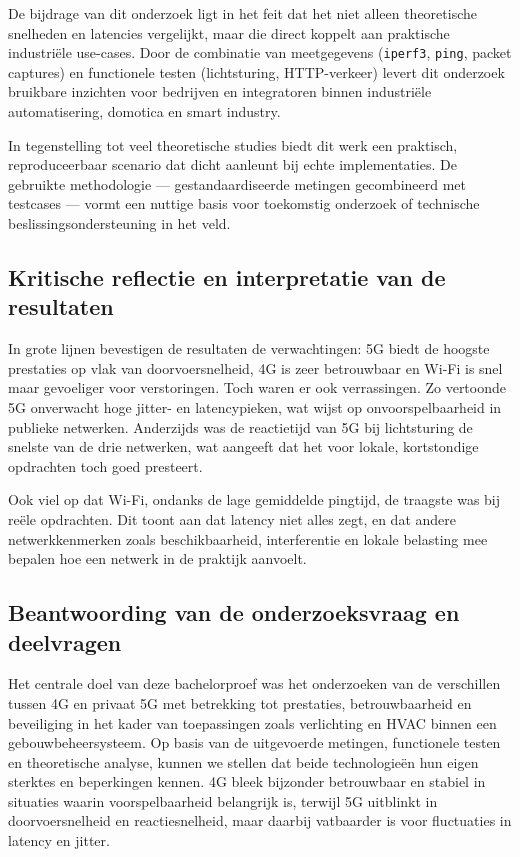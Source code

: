 De bijdrage van dit onderzoek ligt in het feit dat het niet alleen theoretische snelheden en latencies vergelijkt, maar die direct koppelt aan praktische industriële use-cases. Door de combinatie van meetgegevens (\texttt{iperf3}, \texttt{ping}, packet captures) en functionele testen (lichtsturing, HTTP-verkeer) levert dit onderzoek bruikbare inzichten voor bedrijven en integratoren binnen industriële automatisering, domotica en smart industry.

In tegenstelling tot veel theoretische studies biedt dit werk een praktisch, reproduceerbaar scenario dat dicht aanleunt bij echte implementaties. De gebruikte methodologie — gestandaardiseerde metingen gecombineerd met testcases — vormt een nuttige basis voor toekomstig onderzoek of technische beslissingsondersteuning in het veld.

\subsection{Kritische reflectie en interpretatie van de resultaten}

In grote lijnen bevestigen de resultaten de verwachtingen: 5G biedt de hoogste prestaties op vlak van doorvoersnelheid, 4G is zeer betrouwbaar en Wi-Fi is snel maar gevoeliger voor verstoringen. Toch waren er ook verrassingen. Zo vertoonde 5G onverwacht hoge jitter- en latencypieken, wat wijst op onvoorspelbaarheid in publieke netwerken. Anderzijds was de reactietijd van 5G bij lichtsturing de snelste van de drie netwerken, wat aangeeft dat het voor lokale, kortstondige opdrachten toch goed presteert.

Ook viel op dat Wi-Fi, ondanks de lage gemiddelde pingtijd, de traagste was bij reële opdrachten. Dit toont aan dat latency niet alles zegt, en dat andere netwerkkenmerken zoals beschikbaarheid, interferentie en lokale belasting mee bepalen hoe een netwerk in de praktijk aanvoelt.



\subsection{Beantwoording van de onderzoeksvraag en deelvragen}

Het centrale doel van deze bachelorproef was het onderzoeken van de verschillen tussen 4G en privaat 5G met betrekking tot prestaties, betrouwbaarheid en beveiliging in het kader van toepassingen zoals verlichting en HVAC binnen een gebouwbeheersysteem. Op basis van de uitgevoerde metingen, functionele testen en theoretische analyse, kunnen we stellen dat beide technologieën hun eigen sterktes en beperkingen kennen. 4G bleek bijzonder betrouwbaar en stabiel in situaties waarin voorspelbaarheid belangrijk is, terwijl 5G uitblinkt in doorvoersnelheid en reactiesnelheid, maar daarbij vatbaarder is voor fluctuaties in latency en jitter. \newline


